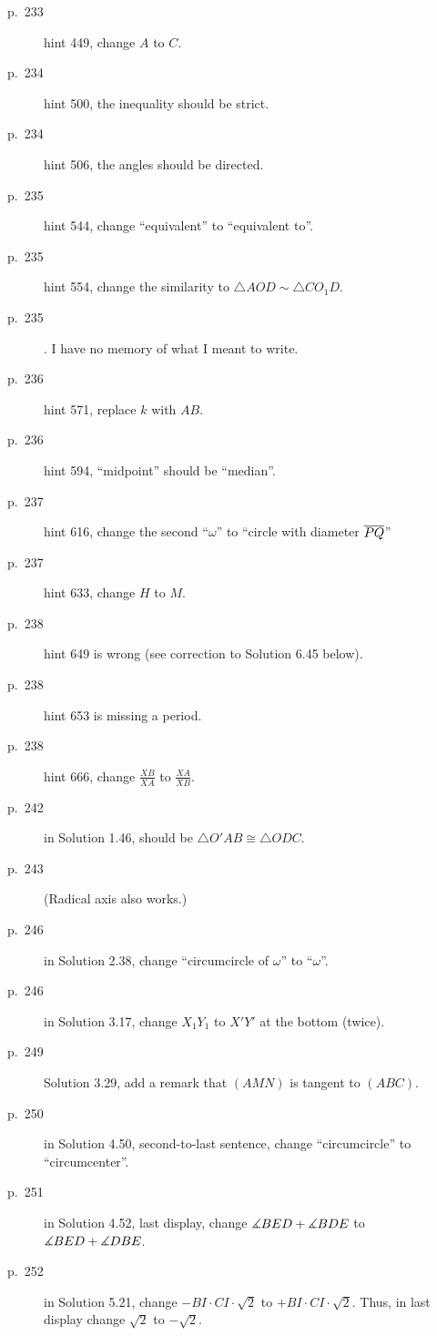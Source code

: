 \documentclass[11pt]{scrartcl}
\begin{document}
\begin{description}
\item[p.\  233] hint 449, change $A$ to $C$.
\item[p.\  234] hint 500, the inequality should be strict.
\item[p.\  234] hint 506, the angles should be directed.
\item[p.\  235] hint 544, change ``equivalent'' to ``equivalent to''.
\item[p.\  235] hint 554, change the similarity to $\triangle AOD \sim \triangle CO_1D$.
\item[p.\  235] . I have no memory of what I meant to write.
\item[p.\  236] hint 571, replace $k$ with $AB$.
\item[p.\  236] hint 594, ``midpoint'' should be ``median''.
\item[p.\  237] hint 616, change the second ``$\omega$'' to ``circle with diameter $\overline{PQ}$''
\item[p.\  237] hint 633, change $H$ to $M$.
\item[p.\  238] hint 649 is wrong (see correction to Solution 6.45 below).
\item[p.\  238] hint 653 is missing a period.
\item[p.\  238] hint 666, change $\frac{XB}{XA}$ to $\frac{XA}{XB}$.
\item[p.\  242] in Solution 1.46, should be $\triangle O'AB \cong \triangle ODC$.
\item[p.\  243] 
  (Radical axis also works.)
\item[p.\  246] in Solution 2.38, change ``circumcircle of $\omega$'' to ``$\omega$''.
\item[p.\  246] in Solution 3.17, change $X_1Y_1$ to $X'Y'$ at the bottom (twice).
\item[p.\  249] Solution 3.29, add a remark that $(AMN)$ is tangent to $(ABC)$.
\item[p.\  250] in Solution 4.50, second-to-last sentence,
  change ``circumcircle'' to ``circumcenter''.
\item[p.\  251] in Solution 4.52, last display,
  change $\measuredangle BED + \measuredangle BDE$ to $\measuredangle BED + \measuredangle DBE$.
\item[p.\  252] in Solution 5.21, change $-BI \cdot CI \cdot \sqrt2$ to $+ BI \cdot CI \cdot \sqrt2$.
  Thus, in last display change $\sqrt2$ to $-\sqrt2$.

\end{description}
\end{document}

